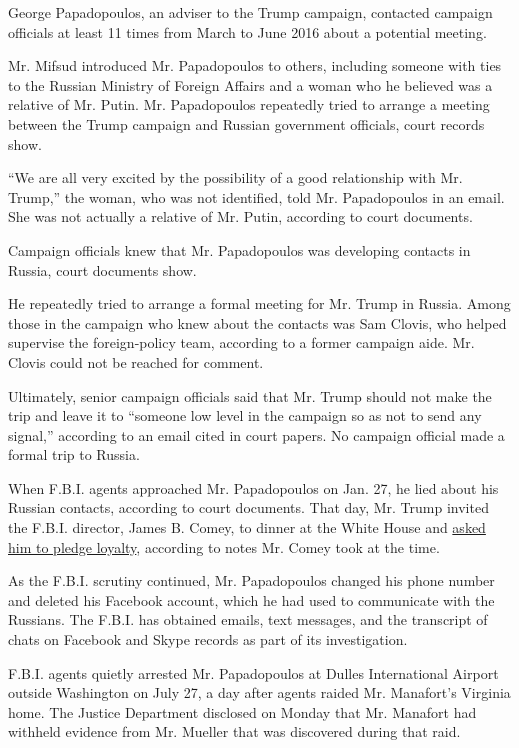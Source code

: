 George Papadopoulos, an adviser to the Trump campaign, contacted
campaign officials at least 11 times from March to June 2016 about a
potential meeting.

Mr. Mifsud introduced Mr. Papadopoulos to others, including someone with
ties to the Russian Ministry of Foreign Affairs and a woman who he
believed was a relative of Mr. Putin. Mr. Papadopoulos repeatedly tried
to arrange a meeting between the Trump campaign and Russian government
officials, court records show.

``We are all very excited by the possibility of a good relationship with
Mr. Trump,'' the woman, who was not identified, told Mr. Papadopoulos in
an email. She was not actually a relative of Mr. Putin, according to
court documents.

Campaign officials knew that Mr. Papadopoulos was developing contacts in
Russia, court documents show.

He repeatedly tried to arrange a formal meeting for Mr. Trump in Russia.
Among those in the campaign who knew about the contacts was Sam Clovis,
who helped supervise the foreign-policy team, according to a former
campaign aide. Mr. Clovis could not be reached for comment.

Ultimately, senior campaign officials said that Mr. Trump should not
make the trip and leave it to ``someone low level in the campaign so as
not to send any signal,'' according to an email cited in court papers.
No campaign official made a formal trip to Russia.

When F.B.I. agents approached Mr. Papadopoulos on Jan. 27, he lied about
his Russian contacts, according to court documents. That day, Mr. Trump
invited the F.B.I. director, James B. Comey, to dinner at the White
House and
\href{https://www.nytimes.com/2017/05/11/us/politics/trump-comey-firing.html}{asked
him to pledge loyalty}, according to notes Mr. Comey took at the time.

As the F.B.I. scrutiny continued, Mr. Papadopoulos changed his phone
number and deleted his Facebook account, which he had used to
communicate with the Russians. The F.B.I. has obtained emails, text
messages, and the transcript of chats on Facebook and Skype records as
part of its investigation.

F.B.I. agents quietly arrested Mr. Papadopoulos at Dulles International
Airport outside Washington on July 27, a day after agents raided Mr.
Manafort's Virginia home. The Justice Department disclosed on Monday
that Mr. Manafort had withheld evidence from Mr. Mueller that was
discovered during that raid.

